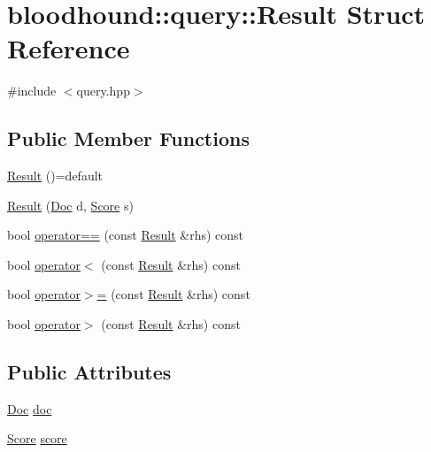\hypertarget{structbloodhound_1_1query_1_1Result}{}\section{bloodhound\+:\+:query\+:\+:Result Struct Reference}
\label{structbloodhound_1_1query_1_1Result}


{\ttfamily \#include $<$query.\+hpp$>$}

\subsection*{Public Member Functions}
\begin{DoxyCompactItemize}
\item 
\hyperlink{structbloodhound_1_1query_1_1Result_a6a9aaa804dbe3929b653b614e18408e1}{Result} ()=default
\item 
\hyperlink{structbloodhound_1_1query_1_1Result_ac4c15cb4d9e60b3e7bf37bd813215f55}{Result} (\hyperlink{structbloodhound_1_1Doc}{Doc} d, \hyperlink{structbloodhound_1_1Score}{Score} s)
\item 
bool \hyperlink{structbloodhound_1_1query_1_1Result_af7fa537e271f9f8b213e207331d5e647}{operator==} (const \hyperlink{structbloodhound_1_1query_1_1Result}{Result} \&rhs) const
\item 
bool \hyperlink{structbloodhound_1_1query_1_1Result_aafd7ab327a6ae26df25272b1ad1ec4c0}{operator$<$} (const \hyperlink{structbloodhound_1_1query_1_1Result}{Result} \&rhs) const
\item 
bool \hyperlink{structbloodhound_1_1query_1_1Result_a5af24f990ab7687d25e25b1f66dfb8a3}{operator$>$=} (const \hyperlink{structbloodhound_1_1query_1_1Result}{Result} \&rhs) const
\item 
bool \hyperlink{structbloodhound_1_1query_1_1Result_af04b71da89ecfa88ee4836dd82fdc058}{operator$>$} (const \hyperlink{structbloodhound_1_1query_1_1Result}{Result} \&rhs) const
\end{DoxyCompactItemize}
\subsection*{Public Attributes}
\begin{DoxyCompactItemize}
\item 
\hyperlink{structbloodhound_1_1Doc}{Doc} \hyperlink{structbloodhound_1_1query_1_1Result_a5f6acbb120aaf435333e410c0595962a}{doc}
\item 
\hyperlink{structbloodhound_1_1Score}{Score} \hyperlink{structbloodhound_1_1query_1_1Result_af9f240e486460b5130eff110b0f3c7a3}{score}
\end{DoxyCompactItemize}


